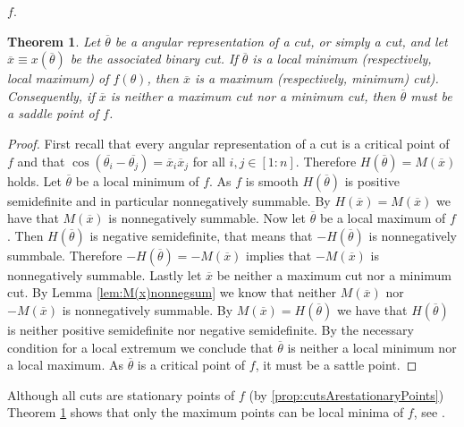 \documentclass[12pt,a4paper]{article}
\theoremstyle{mythm}
\newtheorem{thm}{Theorem}[section]
\begin{document}
$ f $.
\begin{thm}
\label{thm:classificationcuts} 
Let $ \overline{ \theta }  $ be a angular representation of a cut, or simply a cut, and let $ \overline{ x } \equiv x( \overline{ \theta } ) $ be the associated binary cut. If $ \overline{ \theta }  $ is a local minimum
(respectively, local maximum) of $ f (\theta) $, then $ \overline{ x }  $ is a maximum (respectively, minimum) cut). 
Consequently, if $ \overline{ x }  $ is neither a maximum cut nor a minimum cut, then $ \overline{ \theta }  $ must be a saddle point of $ f $.
\end{thm} 
\begin{proof}
First recall that every angular representation of a cut is a critical point of $ f $ and that 
$ \cos( \overline{ \theta_i } - \overline{ \theta_j }  ) = \overline{ x }_i \overline{ x }_j  $ for all $ i,j \in \left[ 1:n \right]  $.
Therefore $ H( \overline{ \theta } ) = M( \overline{ x } ) $ holds.
Let $ \overline{ \theta }  $ be a local minimum of $ f $.
As $ f $ is smooth $ H ( \overline{ \theta } ) $ is positive semidefinite and in particular nonnegatively summable. By $ H ( \overline{ x } ) = M ( \overline{ x } ) $ we have
that $ M ( \overline{ x } ) $ is nonnegatively summable.
Now let $ \overline{ \theta }  $ be a local maximum of $ f $. Then $ H ( \overline{ \theta } ) $ is negative semidefinite, that means that $ - H ( \overline{ \theta } ) $ is
nonnegatively summbale. Therefore $ - H ( \overline{ \theta } ) = - M ( \overline{ x } ) $ implies that $ - M ( \overline{ x } ) $ is nonnegatively summable.
Lastly let $ \overline{ x }  $ be neither a maximum cut nor a minimum cut.
By Lemma \ref{lem:M(x)nonnegsum} we know that neither $ M ( \overline{ x } ) $ nor $ - M ( \overline{ x } ) $ is nonnegatively summable. 
By $ M ( \overline{  x } ) = H ( \overline{ \theta } ) $ we have that $ H ( \overline{ \theta } )  $ is neither positive semidefinite nor negative semidefinite. By the
necessary condition for a local extremum we conclude that $ \overline{ \theta }  $ is neither a local minimum nor a local maximum. As $ \overline{ \theta }  $ is a critical
point of $ f $, it must be a sattle point.
\end{proof}
Although all cuts are stationary points of $ f $ (by \ref{prop:cutsArestationaryPoints}) Theorem \ref{thm:classificationcuts} shows that only the maximum points can be local minima of $ f $, see \cite[p. 508]{Burer2002}.
\end{document}
